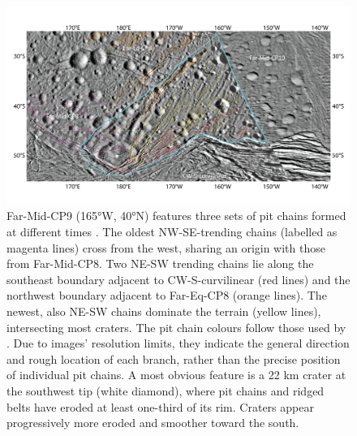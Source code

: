 \documentclass[preprint,11pt,3p,times,authoryear]{elsarticle}
\begin{document}
{\begin{figure}[t]
    \includegraphics[width=1.0\linewidth]{fig/FigS4B_Far-Mid-CP9.png}
    \caption{Far-Mid-CP9 (165°W, 40°N) features three sets of pit chains formed at different times \citep{Martin2014}. The oldest NW-SE-trending chains (labelled as magenta lines) cross from the west, sharing an origin with those from Far-Mid-CP8. Two NE-SW trending chains lie along the southeast boundary adjacent to CW-S-curvilinear (red lines) and the northwest boundary adjacent to Far-Eq-CP8 (orange lines). The newest, also NE-SW chains dominate the terrain (yellow lines), intersecting most craters. The pit chain colours follow those used by \citet{Martin2014}. Due to images’ resolution limits, they indicate the general direction and rough location of each branch, rather than the precise position of individual pit chains. A most obvious feature is a 22 km crater at the southwest tip (white diamond), where pit chains and ridged belts have eroded at least one-third of its rim. Craters appear progressively more eroded and smoother toward the south.}
    \label{fig:app_erosion3}
\end{figure}

}
\end{document}
